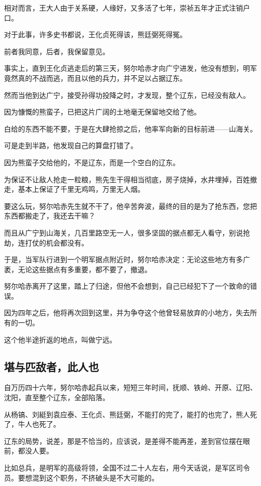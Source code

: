 \begin{multicols}{\theparacolNo}
		相对而言，王大人由于关系硬，人缘好，又多活了七年，崇祯五年才正式注销户口。

		对于此事，许多史书都说，王化贞死得该，熊廷弼死得冤。

		前者我同意，后者，我保留意见。

		事实上，直到王化贞逃走后的第三天，努尔哈赤才向广宁进发，他没有想到，明军竟然真的不战而逃，而且以他的兵力，并不足以占据辽东。

		然而当他到达广宁，接受孙得功投降之时，才发现，整个辽东，已经没有敌人。

		因为慷慨的熊蛮子，已把这片广阔的土地毫无保留地交给了他。

		白给的东西不能不要，于是在大肆抢掠之后，他率军向新的目标前进——山海关。

		可是走到半路，他发现自己的算盘打错了。

		因为熊蛮子交给他的，不是辽东，而是一个空白的辽东。

		为保证不让敌人抢走一粒粮，熊先生干得相当彻底，房子烧掉，水井埋掉，百姓撤走，基本上保证了千里无鸡鸣，万里无人烟。

		要这么玩，努尔哈赤先生就不干了，他辛苦奔波，最终的目的是为了抢东西，您把东西都搬走了，我还去干嘛？

		而且从广宁到山海关，几百里路空无一人，很多坚固的据点都无人看守，别说抢劫，连打仗的机会都没有。

		于是，当军队行进到一个明军据点附近时，努尔哈赤决定：无论这些地方有多广袤，无论这些据点有多重要，都不要了，撤退。

		努尔哈赤离开了这里，踏上了归途，但他不会想到，自己已经犯下了一个致命的错误。

		因为四年之后，他将再次回到这里，并为争夺这个他曾轻易放弃的小地方，失去所有的一切。

		这个他半途折返的地点，叫做宁远。

		\subsection{堪与匹敌者，此人也}
		自万历四十六年，努尔哈赤起兵以来，短短三年时间，抚顺、铁岭、开原、辽阳、沈阳，直至整个辽东，全部陷落。

		从杨镐、刘綎到袁应泰、王化贞、熊廷弼，不能打的完了，能打的也完了，熊人死了，牛人也死了。

		辽东的局势，说差，那是不恰当的，应该说，是差得不能再差，差到官位摆在眼前，都没人要。

		比如总兵，是明军的高级将领，全国不过二十人左右，用今天话说，是军区司令员。要想混到这个职务，不挤破头是不大可能的。


\end{multicols}

